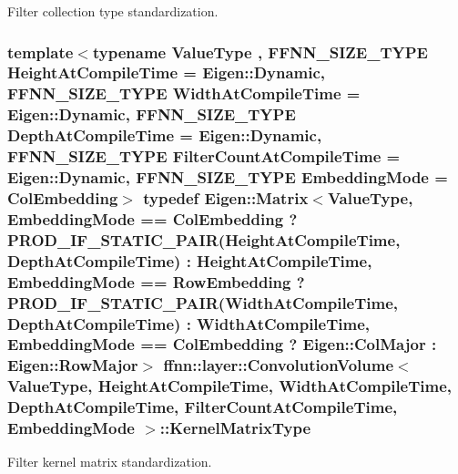 Filter collection type standardization. 

\hypertarget{classffnn_1_1layer_1_1_convolution_volume_ad9e8c125cbb78904740960464e3b6334}{
\subsubsection[{Kernel\-Matrix\-Type}]{\setlength{\rightskip}{0pt plus 5cm}template$<$typename Value\-Type , F\-F\-N\-N\-\_\-\-S\-I\-Z\-E\-\_\-\-T\-Y\-P\-E Height\-At\-Compile\-Time = Eigen\-::\-Dynamic, F\-F\-N\-N\-\_\-\-S\-I\-Z\-E\-\_\-\-T\-Y\-P\-E Width\-At\-Compile\-Time = Eigen\-::\-Dynamic, F\-F\-N\-N\-\_\-\-S\-I\-Z\-E\-\_\-\-T\-Y\-P\-E Depth\-At\-Compile\-Time = Eigen\-::\-Dynamic, F\-F\-N\-N\-\_\-\-S\-I\-Z\-E\-\_\-\-T\-Y\-P\-E Filter\-Count\-At\-Compile\-Time = Eigen\-::\-Dynamic, F\-F\-N\-N\-\_\-\-S\-I\-Z\-E\-\_\-\-T\-Y\-P\-E Embedding\-Mode = Col\-Embedding$>$ typedef Eigen\-::\-Matrix$<$Value\-Type, {\bf Embedding\-Mode} == {\bf Col\-Embedding} ? {\bf P\-R\-O\-D\-\_\-\-I\-F\-\_\-\-S\-T\-A\-T\-I\-C\-\_\-\-P\-A\-I\-R}(Height\-At\-Compile\-Time, Depth\-At\-Compile\-Time) \-: Height\-At\-Compile\-Time, {\bf Embedding\-Mode} == {\bf Row\-Embedding} ? {\bf P\-R\-O\-D\-\_\-\-I\-F\-\_\-\-S\-T\-A\-T\-I\-C\-\_\-\-P\-A\-I\-R}(Width\-At\-Compile\-Time, Depth\-At\-Compile\-Time) \-: Width\-At\-Compile\-Time, {\bf Embedding\-Mode} == {\bf Col\-Embedding} ? Eigen\-::\-Col\-Major \-: Eigen\-::\-Row\-Major$>$ {\bf ffnn\-::layer\-::\-Convolution\-Volume}$<$ Value\-Type, Height\-At\-Compile\-Time, Width\-At\-Compile\-Time, Depth\-At\-Compile\-Time, Filter\-Count\-At\-Compile\-Time, {\bf Embedding\-Mode} $>$\-::{\bf Kernel\-Matrix\-Type}}}\label{classffnn_1_1layer_1_1_convolution_volume_ad9e8c125cbb78904740960464e3b6334}


Filter kernel matrix standardization. 

